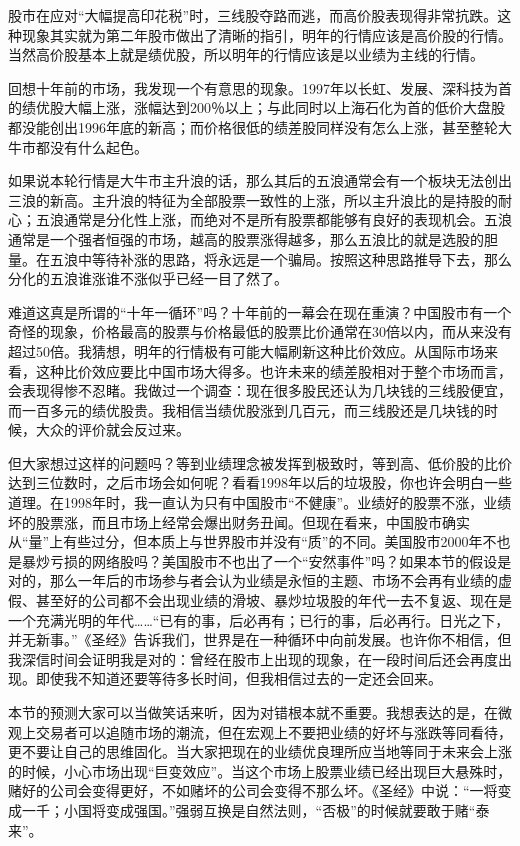 股市在应对“大幅提高印花税”时，三线股夺路而逃，而高价股表现得非常抗跌。这种现象其实就为第二年股市做出了清晰的指引，明年的行情应该是高价股的行情。当然高价股基本上就是绩优股，所以明年的行情应该是以业绩为主线的行情。

回想十年前的市场，我发现一个有意思的现象。1997年以长虹、发展、深科技为首的绩优股大幅上涨，涨幅达到200％以上；与此同时以上海石化为首的低价大盘股都没能创出1996年底的新高；而价格很低的绩差股同样没有怎么上涨，甚至整轮大牛市都没有什么起色。

如果说本轮行情是大牛市主升浪的话，那么其后的五浪通常会有一个板块无法创出三浪的新高。主升浪的特征为全部股票一致性的上涨，所以主升浪比的是持股的耐心；五浪通常是分化性上涨，而绝对不是所有股票都能够有良好的表现机会。五浪通常是一个强者恒强的市场，越高的股票涨得越多，那么五浪比的就是选股的胆量。在五浪中等待补涨的思路，将永远是一个骗局。按照这种思路推导下去，那么分化的五浪谁涨谁不涨似乎已经一目了然了。

难道这真是所谓的“十年一循环”吗？十年前的一幕会在现在重演？中国股市有一个奇怪的现象，价格最高的股票与价格最低的股票比价通常在30倍以内，而从来没有超过50倍。我猜想，明年的行情极有可能大幅刷新这种比价效应。从国际市场来看，这种比价效应要比中国市场大得多。也许未来的绩差股相对于整个市场而言，会表现得惨不忍睹。我做过一个调查：现在很多股民还认为几块钱的三线股便宜，而一百多元的绩优股贵。我相信当绩优股涨到几百元，而三线股还是几块钱的时候，大众的评价就会反过来。

但大家想过这样的问题吗？等到业绩理念被发挥到极致时，等到高、低价股的比价达到三位数时，之后市场会如何呢？看看1998年以后的垃圾股，你也许会明白一些道理。在1998年时，我一直认为只有中国股市“不健康”。业绩好的股票不涨，业绩坏的股票涨，而且市场上经常会爆出财务丑闻。但现在看来，中国股市确实从“量”上有些过分，但本质上与世界股市并没有“质”的不同。美国股市2000年不也是暴炒亏损的网络股吗？美国股市不也出了一个“安然事件”吗？如果本节的假设是对的，那么一年后的市场参与者会认为业绩是永恒的主题、市场不会再有业绩的虚假、甚至好的公司都不会出现业绩的滑坡、暴炒垃圾股的年代一去不复返、现在是一个充满光明的年代……“已有的事，后必再有；已行的事，后必再行。日光之下，并无新事。”《圣经》告诉我们，世界是在一种循环中向前发展。也许你不相信，但我深信时间会证明我是对的：曾经在股市上出现的现象，在一段时间后还会再度出现。即使我不知道还要等待多长时间，但我相信过去的一定还会回来。

本节的预测大家可以当做笑话来听，因为对错根本就不重要。我想表达的是，在微观上交易者可以追随市场的潮流，但在宏观上不要把业绩的好坏与涨跌等同看待，更不要让自己的思维固化。当大家把现在的业绩优良理所应当地等同于未来会上涨的时候，小心市场出现“巨变效应”。当这个市场上股票业绩已经出现巨大悬殊时，赌好的公司会变得更好，不如赌坏的公司会变得不那么坏。《圣经》中说：“一将变成一千；小国将变成强国。”强弱互换是自然法则，“否极”的时候就要敢于赌“泰来”。

